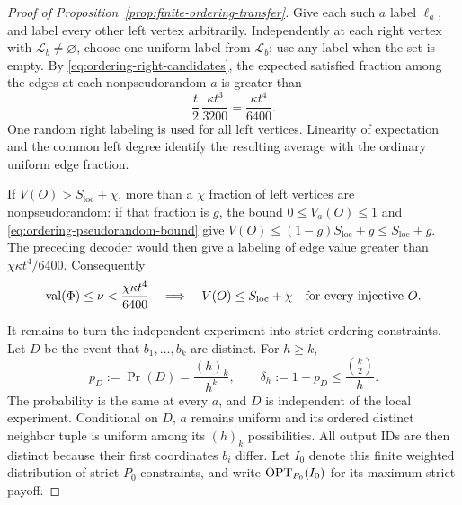 \begin{proof}[Proof of Proposition~\ref{prop:finite-ordering-transfer}]
Give each such \(a\) label \(\ell_a\), and label every other left
vertex arbitrarily.  Independently at each right vertex with
\(\mathcal L_b\ne\varnothing\), choose one uniform label from
\(\mathcal L_b\); use any label when the set is empty.  By
\eqref{eq:ordering-right-candidates}, the expected satisfied fraction
among the edges at each nonpseudorandom \(a\) is greater than
\[
 \frac t2\,\frac{\kappa t^3}{3200}
 =\frac{\kappa t^4}{6400}.
\]
One random right labeling is used for all left vertices.  Linearity
of expectation and the common left degree identify the resulting
average with the ordinary uniform edge fraction.

If \(V(O)>S_{\mathrm{loc}}+\chi\), more than a \(\chi\) fraction of
left vertices are nonpseudorandom: if that fraction is \(g\), the bound
\(0\le V_a(O)\le1\) and \eqref{eq:ordering-pseudorandom-bound} give
\(V(O)\le(1-g)S_{\mathrm{loc}}+g\le S_{\mathrm{loc}}+g\).  The
preceding decoder would then give a labeling of edge value greater than
\(\chi\kappa t^4/6400\).
Consequently
\begin{equation}
 \operatorname{val}(\Phi)\le\nu<\frac{\chi\kappa t^4}{6400}
 \quad\Longrightarrow\quad
 V(O)\le S_{\mathrm{loc}}+\chi\quad\text{for every injective }O.
\label{eq:ordering-iid-soundness}
\end{equation}

It remains to turn the independent experiment into strict ordering
constraints.  Let \(D\) be the event that \(b_1,\ldots,b_k\) are
distinct.  For \(h\ge k\),
\begin{equation}
 p_D:=\Pr(D)=\frac{(h)_k}{h^k},\qquad
 \delta_h:=1-p_D\le\frac{\binom{k}{2}}h.
\label{eq:ordering-distinct-probability}
\end{equation}
The probability is the same at every \(a\), and \(D\) is independent
of the local experiment.  Conditional on \(D\), \(a\) remains uniform
and its ordered distinct neighbor tuple is uniform among its
\((h)_k\) possibilities.  All output IDs are then distinct because
their first coordinates \(b_i\) differ.  Let \(I_0\) denote this finite
weighted distribution of strict \(P_0\) constraints, and write
\(\operatorname{OPT}_{P_0}(I_0)\) for its maximum strict payoff.


\end{proof}
